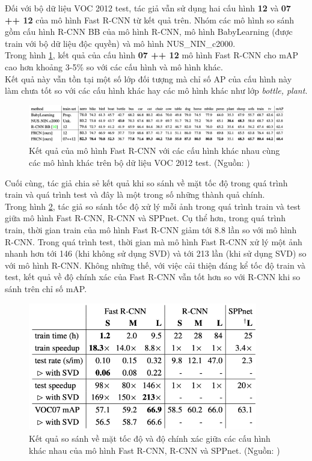 {    \noindent
    Đối với bộ dữ liệu VOC 2012 test, tác giả vẫn sử dụng hai cấu hình \textbf{12} và \textbf{07 ++ 12} của mô hình Fast R-CNN từ kết quả trên. Nhóm các mô hình so sánh gồm cấu hình R-CNN BB của mô hình R-CNN, mô hình BabyLearning (được train với bộ dữ liệu độc quyền) và mô hình NUS\_NIN\_c2000. \\
    Trong hình \ref{fig:fast_rcnn_results_3}, kết quả của cấu hình \textbf{07 ++ 12} mô hình Fast R-CNN cho mAP cao hơn khoảng 3-5\% so với các cấu hình và mô hình khác. \\
    Kết quả này vẫn tồn tại một số lớp đối tượng mà chỉ số AP của cấu hình này làm chưa tốt so với các cấu hình khác hay các mô hình khác như lớp \textit{bottle, plant}.

    \begin{figure}[H]
        \centering
        \includegraphics[width=15cm] {images/fast_rcnn_results_3}
        \caption{Kết quả của mô hình Fast R-CNN với các cấu hình khác nhau cùng các mô hình khác trên bộ dữ liệu VOC 2012 test. (Nguồn: \cite{girshick2015fast})}
        \label{fig:fast_rcnn_results_3}
    \end{figure}

    \noindent
    Cuối cùng, tác giả chia sẻ kết quả khi so sánh về mặt tốc độ trong quá trình train và quá trình test và đây là một trong số những thành quả chính. \\
    Trong hình \ref{fig:fast_rcnn_results_4}, tác giả so sánh tốc độ xử lý mỗi ảnh trong quá trình train và test giữa mô hình Fast R-CNN, R-CNN và SPPnet.
    Cụ thể hơn, trong quá trình train, thời gian train của mô hình Fast R-CNN giảm tới 8.8 lần so với mô hình R-CNN.
    Trong quá trình test, thời gian mà mô hình Fast R-CNN xử lý một ảnh nhanh hơn tới 146 (khi không sử dụng SVD) và tới 213 lần (khi sử dụng SVD) so với mô hình R-CNN.
    Không những thế, với việc cải thiện đáng kể tốc độ train và test, kết quả về độ chính xác của Fast R-CNN vẫn tốt hơn so với R-CNN khi so sánh trên chỉ số mAP.

    \begin{figure}[H]
        \centering
        \includegraphics[width=10cm] {images/fast_rcnn_results_4}
        \caption{Kết quả so sánh về mặt tốc độ và độ chính xác giữa các cấu hình khác nhau của mô hình Fast R-CNN, R-CNN và SPPnet. (Nguồn: \cite{girshick2015fast})}
        \label{fig:fast_rcnn_results_4}
    \end{figure}

}
